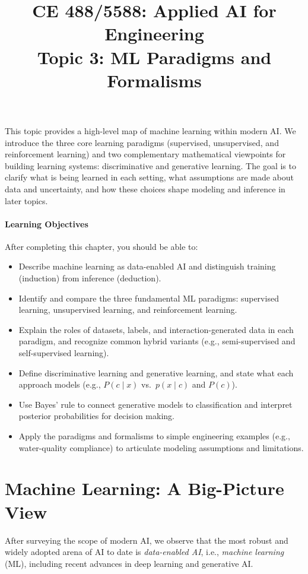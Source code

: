 \documentclass[12pt]{article}
\begin{document}
\doublespacing	

\title{CE 488/5588: Applied AI for Engineering\\ \large Topic 3: ML Paradigms and Formalisms}
\author{}
\date{}
\maketitle



\noindent
This topic provides a high-level map of machine learning within modern AI. We introduce the three core learning paradigms (supervised, unsupervised, and reinforcement learning) and two complementary mathematical viewpoints for building learning systems: discriminative and generative learning. The goal is to clarify what is being learned in each setting, what assumptions are made about data and uncertainty, and how these choices shape modeling and inference in later topics.

\paragraph{Learning Objectives} After completing this chapter, you should be able to:
\begin{itemize}
    \item Describe machine learning as data-enabled AI and distinguish training (induction) from inference (deduction).
    \item Identify and compare the three fundamental ML paradigms: supervised learning, unsupervised learning, and reinforcement learning.
    \item Explain the roles of datasets, labels, and interaction-generated data in each paradigm, and recognize common hybrid variants (e.g., semi-supervised and self-supervised learning).
    \item Define discriminative learning and generative learning, and state what each approach models (e.g., $P(c\mid x)$ vs.\ $p(x\mid c)$ and $P(c)$).
    \item Use Bayes' rule to connect generative models to classification and interpret posterior probabilities for decision making.
    \item Apply the paradigms and formalisms to simple engineering examples (e.g., water-quality compliance) to articulate modeling assumptions and limitations.
\end{itemize}

\noindent


\section{Machine Learning: A Big-Picture View}
After surveying the scope of modern AI, we observe that the most robust and widely adopted arena of AI to date is \emph{data-enabled AI}, i.e., \emph{machine learning} (ML), including recent advances in deep learning and generative AI.
\end{document}
